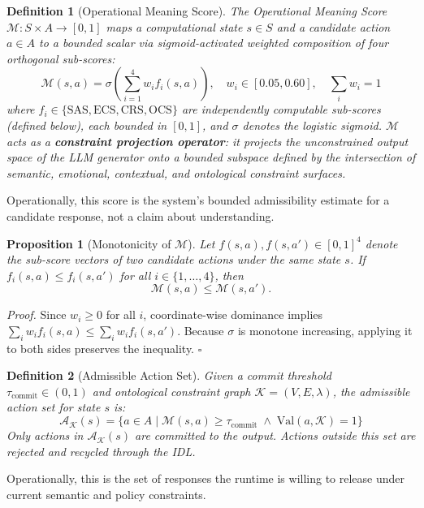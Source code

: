 \documentclass[11pt,a4paper]{article}
\newtheorem{definition}{Definition}
\newtheorem{proposition}{Proposition}
\begin{document}
\begin{definition}[Operational Meaning Score]
\label{def:meaning}
The Operational Meaning Score $\mathcal{M}: S \times A \rightarrow [0,1]$ maps a computational state $s \in S$ and a candidate action $a \in A$ to a bounded scalar via sigmoid-activated weighted composition of four orthogonal sub-scores:
\begin{equation}
  \mathcal{M}(s,a) = \sigma\!\left(\textstyle\sum_{i=1}^{4} w_i f_i(s,a)\right), \quad w_i \in [0.05, 0.60], \quad \textstyle\sum_i w_i = 1
  \label{eq:meaning_formal}
\end{equation}
where $f_i \in \{\text{SAS}, \text{ECS}, \text{CRS}, \text{OCS}\}$ are independently computable sub-scores (defined below), each bounded in $[0,1]$, and $\sigma$ denotes the logistic sigmoid. $\mathcal{M}$ acts as a \textbf{constraint projection operator}: it projects the unconstrained output space of the LLM generator onto a bounded subspace defined by the intersection of semantic, emotional, contextual, and ontological constraint surfaces.
\end{definition}
Operationally, this score is the system's bounded admissibility estimate for a candidate response, not a claim about understanding.

\begin{proposition}[Monotonicity of $\mathcal{M}$]
\label{prop:monotonicity}
Let $f(s,a),f(s,a') \in [0,1]^4$ denote the sub-score vectors of two candidate actions under the same state $s$. If $f_i(s,a)\leq f_i(s,a')$ for all $i\in\{1,\dots,4\}$, then
\[
\mathcal{M}(s,a)\leq \mathcal{M}(s,a').
\]
\end{proposition}

\textit{Proof.} Since $w_i\geq 0$ for all $i$, coordinate-wise dominance implies $\sum_i w_i f_i(s,a)\leq \sum_i w_i f_i(s,a')$. Because $\sigma$ is monotone increasing, applying it to both sides preserves the inequality. $\square$

\begin{definition}[Admissible Action Set]
\label{def:admissible}
Given a commit threshold $\tau_{\text{commit}} \in (0,1)$ and ontological constraint graph $\mathcal{K}=(V,E,\lambda)$, the admissible action set for state $s$ is:
\begin{equation}
  \mathcal{A}_{\mathcal{K}}(s) = \{a \in A \mid \mathcal{M}(s,a) \geq \tau_{\text{commit}} \;\wedge\; \mathrm{Val}(a,\mathcal{K})=1 \}
  \label{eq:admissible}
\end{equation}
Only actions in $\mathcal{A}_{\mathcal{K}}(s)$ are committed to the output. Actions outside this set are rejected and recycled through the IDL.
\end{definition}
Operationally, this is the set of responses the runtime is willing to release under current semantic and policy constraints.
\end{document}
